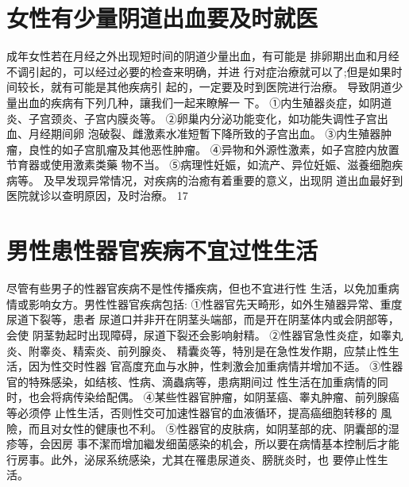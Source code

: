 \documentclass[12pt,UTF8]{ctexbook}
\begin{document}
\section{女性有少量阴道出血要及时就医}
成年女性若在月经之外出现短时间的阴道少量出血，有可能是
排卵期出血和月经不调引起的，可以经过必要的检查来明确，并进
行对症治療就可以了;但是如果时间较长，就有可能是其他疾病引
起的，一定要及时到医院进行治療。
导致阴道少量出血的疾病有下列几种，讓我们一起来瞭解一
下。
①内生殖器炎症，如阴道炎、子宫颈炎、子宫内膜炎等。
②卵巢内分泌功能变化，如功能失调性子宫出血、月经期间卵
泡破裂、雌激素水准短暫下降所致的子宫出血。
③内生殖器肿瘤，良性的如子宫肌瘤及其他恶性肿瘤。
④异物和外源性激素，如子宫腔内放置节育器或使用激素类藥
物不当。
⑤病理性妊娠，如流产、异位妊娠、滋養细胞疾病等。
及早发现异常情况，对疾病的治癒有着重要的意义，出现阴
道出血最好到医院就诊以查明原因，及时治療。
17
\section{男性患性器官疾病不宜过性生活}
尽管有些男子的性器官疾病不是性传播疾病，但也不宜进行性
生活，以免加重病情或影响女方。男性性器官疾病包括:
①性器官先天畸形，如外生殖器异常、重度尿道下裂等，患者
尿道口并非开在阴茎头端部，而是开在阴茎体内或会阴部等，会使
阴茎勃起时出现障碍，尿道下裂还会影响射精。
②性器官急性炎症，如睾丸炎、附睾炎、精索炎、前列腺炎、
精囊炎等，特別是在急性发作期，应禁止性生活，因为性交时性器
官高度充血与水肿，性刺激会加重病情并增加不适。
③性器官的特殊感染，如结核、性病、滴蟲病等，患病期间过
性生活在加重病情的同时，也会将病传染给配偶。
④某些性器官肿瘤，如阴茎癌、睾丸肿瘤、前列腺癌等必须停
止性生活，否则性交可加速性器官的血液循环，提高癌细胞转移的
風險，而且对女性的健康也不利。
⑤性器官的皮肤病，如阴茎部的疣、阴囊部的湿疹等，会因房
事不潔而增加繼发细菌感染的机会，所以要在病情基本控制后才能
行房事。此外，泌尿系统感染，尤其在罹患尿道炎、膀胱炎时，也
要停止性生活。
\end{document}
